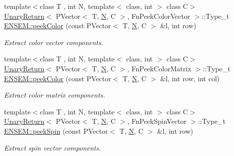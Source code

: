 \begin{DoxyCompactItemize}
{\footnotesize template$<$class T , int N, template$<$ class, int $>$ class C$>$ }\\\mbox{\hyperlink{structUnaryReturn}{Unary\+Return}}$<$ P\+Vector$<$ T, \mbox{\hyperlink{adat__devel_2lib_2hadron_2operator__name__util_8cc_a7722c8ecbb62d99aee7ce68b1752f337}{N}}, C $>$, Fn\+Peek\+Color\+Vector $>$\+::Type\+\_\+t \mbox{\hyperlink{group__primvector_ga69a1dd204a81451dda8a8a886a17b5c9}{E\+N\+S\+E\+M\+::peek\+Color}} (const P\+Vector$<$ T, \mbox{\hyperlink{adat__devel_2lib_2hadron_2operator__name__util_8cc_a7722c8ecbb62d99aee7ce68b1752f337}{N}}, C $>$ \&l, int row)
\begin{DoxyCompactList}\small\item\em Extract color vector components. \end{DoxyCompactList}\item 
{\footnotesize template$<$class T , int N, template$<$ class, int $>$ class C$>$ }\\\mbox{\hyperlink{structUnaryReturn}{Unary\+Return}}$<$ P\+Vector$<$ T, \mbox{\hyperlink{adat__devel_2lib_2hadron_2operator__name__util_8cc_a7722c8ecbb62d99aee7ce68b1752f337}{N}}, C $>$, Fn\+Peek\+Color\+Matrix $>$\+::Type\+\_\+t \mbox{\hyperlink{group__primvector_gaa5bcf955bf475e0717ffc91e91c154b9}{E\+N\+S\+E\+M\+::peek\+Color}} (const P\+Vector$<$ T, \mbox{\hyperlink{adat__devel_2lib_2hadron_2operator__name__util_8cc_a7722c8ecbb62d99aee7ce68b1752f337}{N}}, C $>$ \&l, int row, int col)
\begin{DoxyCompactList}\small\item\em Extract color matrix components. \end{DoxyCompactList}\item 
{\footnotesize template$<$class T , int N, template$<$ class, int $>$ class C$>$ }\\\mbox{\hyperlink{structUnaryReturn}{Unary\+Return}}$<$ P\+Vector$<$ T, \mbox{\hyperlink{adat__devel_2lib_2hadron_2operator__name__util_8cc_a7722c8ecbb62d99aee7ce68b1752f337}{N}}, C $>$, Fn\+Peek\+Spin\+Vector $>$\+::Type\+\_\+t \mbox{\hyperlink{group__primvector_ga4da125100d39a8e268564ed66d48bae5}{E\+N\+S\+E\+M\+::peek\+Spin}} (const P\+Vector$<$ T, \mbox{\hyperlink{adat__devel_2lib_2hadron_2operator__name__util_8cc_a7722c8ecbb62d99aee7ce68b1752f337}{N}}, C $>$ \&l, int row)
\begin{DoxyCompactList}\small\item\em Extract spin vector components. \end{DoxyCompactList}\item 

\end{DoxyCompactItemize}
